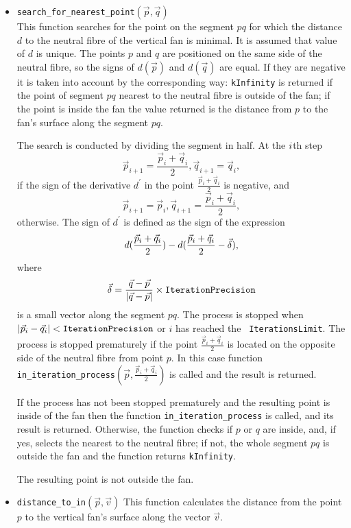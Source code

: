 \documentclass{article}
\begin{document}
\begin{itemize}
\item {\tt search\_for\_nearest\_point$(\vec{p}, \vec{q})$}\\
This function searches for the point on the segment $pq$ for which the
 distance $d$ to the neutral fibre of the vertical fan is minimal. It
 is assumed that value of $d$ is unique.  The points $p$ and $q$ are
 positioned on the same side of the neutral fibre, so the signs of
 $d(\vec{p})$ and $d(\vec{q})$ are equal. If they are negative it is
 taken into account by the corresponding way: {\tt kInfinity} is returned
 if the point of segment $pq$ nearest to the neutral fibre is outside
 of the fan; if the point is inside the fan the value returned is the
 distance from $p$ to the fan's surface along the segment $pq$.

The search is conducted by dividing the segment in half.
At the $i\/$th step 
\[ \vec{p}_{i+1} = \frac{\vec{p}_i+\vec{q}_i}{2}, \vec{q}_{i+1} = \vec{q}_i,\]
if the sign of the derivative $d^{\prime}$ in the point
$\frac{\vec{p}_i+\vec{q}_i}{2}$ is negative, and \[\vec{p}_{i+1} = \vec{p}_i,
\vec{q}_{i+1} = \frac{\vec{p}_i+\vec{q}_i}{2},\] 
otherwise. 
The sign of $d^{\prime}$ is defined as the sign of the expression
\[d(\frac{\vec{p}_i+\vec{q}_i}{2}) -
d(\frac{\vec{p}_i+\vec{q}_i}{2}-\vec{\delta})\/,\] where \[\vec{\delta} =
\frac{\vec{q}-\vec{p}}{|\vec{q}-\vec{p}|}\times{\tt
  IterationPrecision}\] is a
small vector along the segment $pq$.
The process is stopped when
$|\vec{p}_i-\vec{q}_i|<{\tt IterationPrecision}\/$ or $i$ has reached the {\tt
IterationsLimit}. The process is stopped prematurely if 
the point $\frac{\vec{p}_i+\vec{q}_i}{2}$ is located on the opposite side
of the neutral fibre from point $p$. In this case function \\
{\tt in\_iteration\_process$(\vec{p}, \frac{\vec{p}_i+\vec{q}_i}{2})$} is called
and the result is returned. 

If the process has not been stopped prematurely and the resulting
 point is inside of the fan then the
function {\tt in\_iteration\_process} is called, and its result is returned.
Otherwise, the function checks if $p$ or $q$ are inside, and, if yes, selects the
nearest to the neutral fibre; if not,
the whole segment $pq$ is outside the fan and the
function returns {\tt kInfinity}.

The resulting point is not outside the fan.

\item {\tt distance\_to\_in$(\vec{p}, \vec{v})$}
This function calculates the distance from the point $p$ to the vertical fan's
surface along the vector $\vec{v}$.


\end{itemize}
\end{document}
